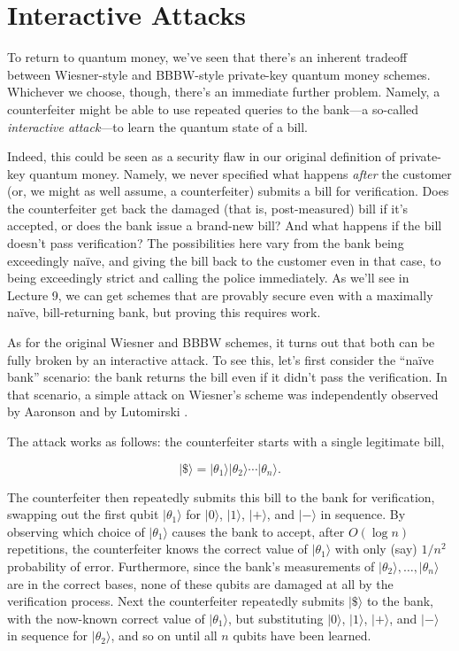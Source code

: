 \documentclass[12pt]{report}
\theoremstyle{plain}
\theoremstyle{definition}
\renewcommand{\ket}[1]{|#1\rangle}
\begin{document}
\section{Interactive Attacks}

To return to quantum money, we've seen that there's an inherent tradeoff between Wiesner-style and BBBW-style private-key quantum money schemes.  Whichever we choose, though, there's an immediate further problem.  Namely, a counterfeiter might be able to use repeated queries to the bank---a so-called {\em interactive attack}---to learn the quantum state of a bill.

Indeed, this could be seen as a security flaw in our original definition of private-key quantum money.  Namely, we never specified what happens {\em after} the customer (or, we might as well assume, a counterfeiter) submits a bill for verification.  Does the counterfeiter get back the damaged (that is, post-measured) bill if it's accepted, or does the bank issue a brand-new bill?  And what happens if the bill doesn't pass verification? The possibilities here vary from the bank being exceedingly na\"{i}ve, and giving the bill back to the customer even in that case, to being exceedingly strict and calling the police immediately.  As we'll see in Lecture 9, we can get schemes that are provably secure even with a maximally na\"{i}ve, bill-returning bank, but proving this requires work.

As for the original Wiesner and BBBW schemes, it turns out that both can be fully broken by an interactive attack.  To see this, let's first consider the ``na\"{i}ve bank'' scenario: the bank returns the bill even if it didn't pass the verification.  In that scenario, a simple attack on Wiesner's scheme was independently observed by Aaronson \cite{Aar09} and by Lutomirski \cite{lutomirski:attack}.

The attack works as follows: the counterfeiter starts with a single legitimate bill,

$$ \ket{\$} = \ket{\theta_1} \ket{\theta_2} \cdots \ket{\theta_n}. $$

The counterfeiter then repeatedly submits this bill to the bank for verification, swapping out the first qubit $\ket{\theta_1}$ for $\ket{0}$, $\ket{1}$, $\ket{+}$, and $\ket{-}$ in sequence.  By observing which choice of $\ket{\theta_1}$ causes the bank to accept, after $O(\log n)$ repetitions, the counterfeiter knows the correct value of $\ket{\theta_1}$ with only (say) $1/n^2$ probability of error.  Furthermore, since the bank's measurements of $\ket{\theta_2}, \ldots, \ket{\theta_n}$ are in the correct bases, none of these qubits are damaged at all by the verification process.  Next the counterfeiter repeatedly submits $\ket{\$}$ to the bank, with the now-known correct value of $\ket{\theta_1}$, but substituting $\ket{0}$, $\ket{1}$, $\ket{+}$, and $\ket{-}$ in sequence for $\ket{\theta_2}$, and so on until all $n$ qubits have been learned.
\end{document}

